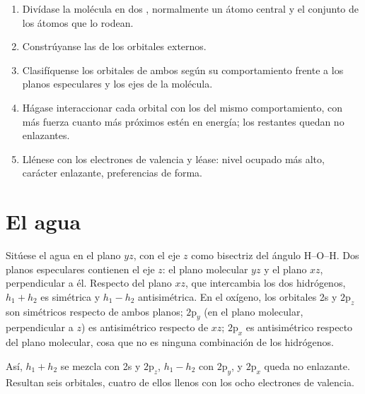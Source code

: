 \begin{method}\label{met:b2:fragment-orbitals:fragment-diagram}
\begin{enumerate}
  \item Divídase la molécula en dos , normalmente un átomo central y el conjunto
        de los átomos que lo rodean.
  \item Constrúyanse las  de los orbitales externos.
  \item Clasifíquense los orbitales de ambos  según su comportamiento frente a los
        planos especulares y los ejes de la molécula.
  \item Hágase interaccionar cada orbital con los del mismo comportamiento, con más fuerza
        cuanto más próximos estén en energía; los restantes quedan no enlazantes.
  \item Llénese con los electrones de valencia y léase: nivel ocupado más alto,
        carácter enlazante, preferencias de forma.
\end{enumerate}
\end{method}

\section{El agua}

Sitúese el agua en el plano $yz$, con el eje $z$ como bisectriz del ángulo H--O--H. Dos
planos especulares contienen el eje $z$: el plano molecular $yz$ y el plano $xz$,
perpendicular a él. Respecto del plano $xz$, que intercambia los dos
hidrógenos, $h_1 + h_2$ es simétrica y $h_1 - h_2$ antisimétrica. En el oxígeno, los orbitales 2s y
$2\mathrm p_z$ son simétricos respecto de ambos planos; $2\mathrm p_y$ (en el
plano molecular, perpendicular a $z$) es antisimétrico respecto de $xz$;
$2\mathrm p_x$ es antisimétrico respecto del plano molecular, cosa que no es ninguna
combinación de los hidrógenos.

Así, $h_1 + h_2$ se mezcla con 2s y $2\mathrm p_z$, $h_1 - h_2$ con $2\mathrm p_y$, y
$2\mathrm p_x$ queda no enlazante. Resultan seis orbitales, cuatro de ellos llenos con los ocho
electrones de valencia.

